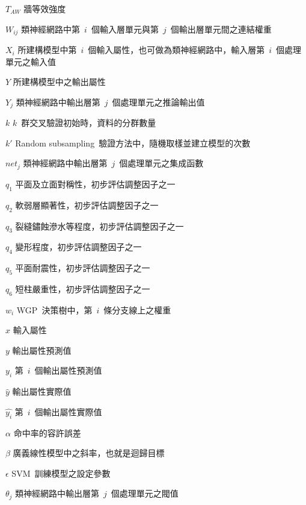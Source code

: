 \begin{SymEntry}
\item[$T_{AW}$]
牆等效強度

\item[$W_{ij}$]
類神經網路中第~$i$~個輸入層單元與第~$j$~個輸出層單元間之連結權重

\item[$X_i$]
所建構模型中第~$i$~個輸入屬性，也可做為類神經網路中，輸入層第~$i$~個處理單元之輸入值

\item[$Y$]
所建構模型中之輸出屬性

\item[$Y_j$]
類神經網路中輸出層第~$j$~個處理單元之推論輸出值

\item[$k$]
$k$~群交叉驗證初始時，資料的分群數量

\item[$k'$]
Random subsampling~驗證方法中，隨機取樣並建立模型的次數

\item[$net_j$]
類神經網路中輸出層第~$j$~個處理單元之集成函數

\item[$q_1$]
平面及立面對稱性，初步評估調整因子之一

\item[$q_2$]
軟弱層顯著性，初步評估調整因子之一

\item[$q_3$]
裂縫鏽蝕滲水等程度，初步評估調整因子之一

\item[$q_4$]
變形程度，初步評估調整因子之一

\item[$q_5$]
平面耐震性，初步評估調整因子之一

\item[$q_6$]
短柱嚴重性，初步評估調整因子之一

\item[$w_i$]
WGP~決策樹中，第~$i$~條分支線上之權重

\item[$x$]
輸入屬性

\item[$y$]
輸出屬性預測值

\item[$y_i$]
第~$i$~個輸出屬性預測值

\item[$\hat{y}$]
輸出屬性實際值

\item[$\hat{y_i}$]
第~$i$~個輸出屬性實際值


\item[$\alpha$]
命中率的容許誤差

\item[$\beta$]
廣義線性模型中之斜率，也就是迴歸目標

\item[$\epsilon$]
SVM~訓練模型之設定參數

\item[$\theta_j$]
類神經網路中輸出層第~$j$~個處理單元之閥值



\end{SymEntry}